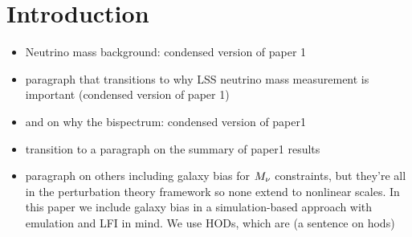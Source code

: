 \section{Introduction} \label{sec:intro}
\begin{itemize} 
    \item Neutrino mass background: condensed version of paper 1 
    \item paragraph that transitions to why LSS neutrino mass measurement is important (condensed version of paper 1) 
    \item and on why the bispectrum: condensed version of paper1
    \item transition to a paragraph on the summary of paper1 results
    \item paragraph on others including galaxy bias for $M_\nu$ constraints, but they're all in the 
    perturbation theory framework so none extend to nonlinear scales. In this paper we include galaxy 
    bias in a simulation-based approach with emulation and LFI in mind. We use HODs, which are 
    (a sentence on hods) 
\end{itemize} 
